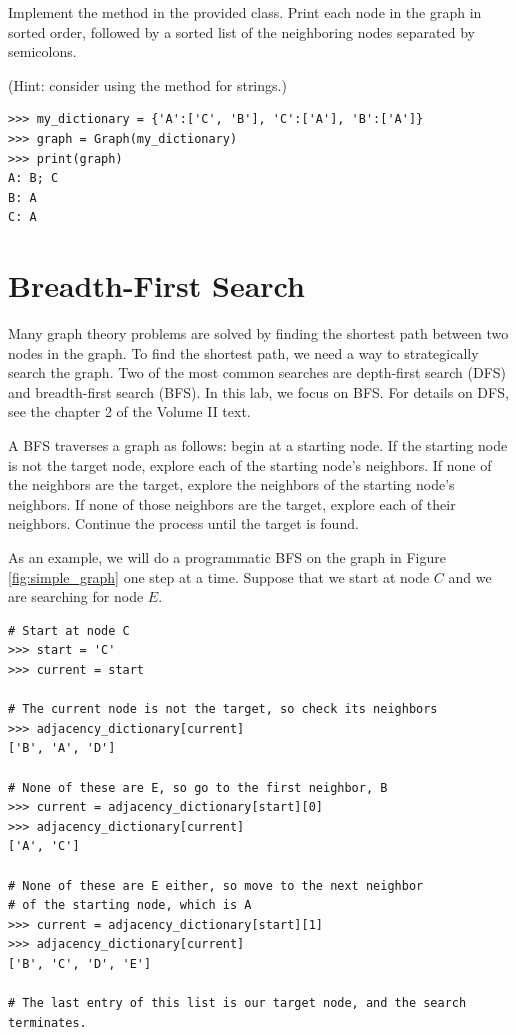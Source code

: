 \begin{problem}
Implement the  method in the provided  class.
Print each node in the graph in sorted order, followed by a sorted list of the neighboring nodes separated by semicolons.

(Hint: consider using the  method for strings.)

\begin{lstlisting}
>>> my_dictionary = {'A':['C', 'B'], 'C':['A'], 'B':['A']}
>>> graph = Graph(my_dictionary)
>>> print(graph)
A: B; C
B: A
C: A
\end{lstlisting}
\end{problem}

\section*{Breadth-First Search}

Many graph theory problems are solved by finding the shortest path between two nodes in the graph.
To find the shortest path, we need a way to strategically search the graph.
Two of the most common searches are depth-first search (DFS) and breadth-first search (BFS).
In this lab, we focus on BFS.
For details on DFS, see the chapter 2 of the Volume II text.

A BFS traverses a graph as follows: begin at a starting node.
If the starting node is not the target node, explore each of the starting node's neighbors.
If none of the neighbors are the target, explore the neighbors of the starting node's neighbors.
If none of those neighbors are the target, explore each of their neighbors.
Continue the process until the target is found.

As an example, we will do a programmatic BFS on the graph in Figure \ref{fig:simple_graph} one step at a time.
Suppose that we start at node $C$ and we are searching for node $E$.

\begin{lstlisting}
# Start at node C
>>> start = 'C'
>>> current = start

# The current node is not the target, so check its neighbors
>>> adjacency_dictionary[current]
['B', 'A', 'D']

# None of these are E, so go to the first neighbor, B
>>> current = adjacency_dictionary[start][0]
>>> adjacency_dictionary[current]
['A', 'C']

# None of these are E either, so move to the next neighbor
# of the starting node, which is A
>>> current = adjacency_dictionary[start][1]
>>> adjacency_dictionary[current]
['B', 'C', 'D', 'E']

# The last entry of this list is our target node, and the search terminates.
\end{lstlisting}

